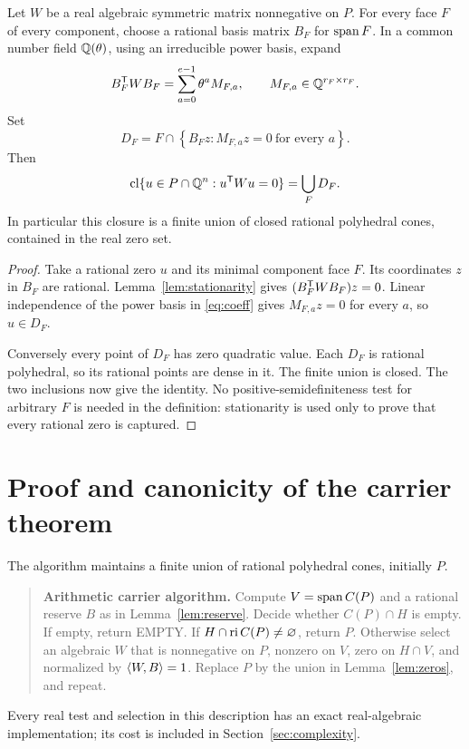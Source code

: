 \begin{lemma}\label{lem:zeros}
Let $W$ be a real algebraic symmetric matrix nonnegative on $P$. For every face $F$ of every component, choose a rational basis matrix $B_F$ for $\operatorname{span} F$. In a common number field $\mathbb Q(\theta)$, using an irreducible power basis, expand
\begin{equation}\label{eq:coeff}
 B_F^{\mathsf T} WB_F=\sum_{a=0}^{e-1}\theta^a M_{F,a},\qquad M_{F,a}\in\mathbb Q^{r_F\times r_F}.
\end{equation}
Set
\begin{equation}\label{eq:DF}
 D_F=F\cap\left\{B_Fz:M_{F,a}z=0\ \text{for every }a\right\}.
\end{equation}
Then
\[
 \operatorname{cl}\{u\in P\cap\mathbb Q^n:u^{\mathsf T} Wu=0\}=\bigcup_F D_F.
\]
In particular this closure is a finite union of closed rational polyhedral cones, contained in the real zero set.
\end{lemma}
\begin{proof}
Take a rational zero $u$ and its minimal component face $F$. Its coordinates $z$ in $B_F$ are rational. Lemma~\ref{lem:stationarity} gives $(B_F^{\mathsf T} WB_F)z=0$. Linear independence of the power basis in \eqref{eq:coeff} gives $M_{F,a}z=0$ for every $a$, so $u\in D_F$.

Conversely every point of $D_F$ has zero quadratic value. Each $D_F$ is rational polyhedral, so its rational points are dense in it. The finite union is closed. The two inclusions now give the identity. No positive-semidefiniteness test for arbitrary $F$ is needed in the definition: stationarity is used only to prove that every rational zero is captured.
\end{proof}

\section{Proof and canonicity of the carrier theorem}\label{sec:carrierproof}
The algorithm maintains a finite union of rational polyhedral cones, initially $P$.

\begin{quote}
\textbf{Arithmetic carrier algorithm.}
Compute $V=\operatorname{span} C(P)$ and a rational reserve $B$ as in Lemma~\ref{lem:reserve}. Decide whether $C(P)\cap H$ is empty. If empty, return EMPTY. If $H\cap\operatorname{ri} C(P)\ne\varnothing$, return $P$. Otherwise select an algebraic $W$ that is nonnegative on $P$, nonzero on $V$, zero on $H\cap V$, and normalized by $\langle W,B\rangle=1$. Replace $P$ by the union in Lemma~\ref{lem:zeros}, and repeat.
\end{quote}
Every real test and selection in this description has an exact real-algebraic implementation; its cost is included in Section~\ref{sec:complexity}.

